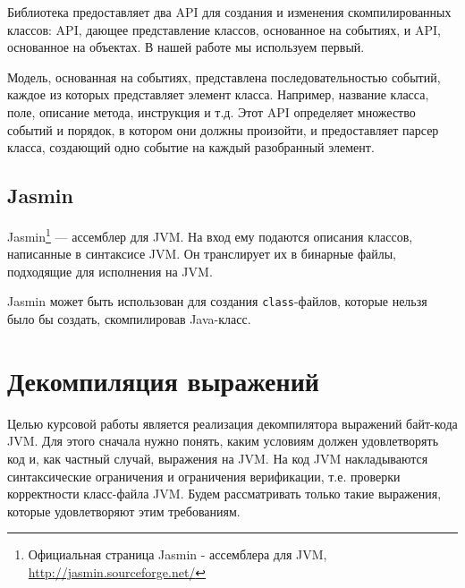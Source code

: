 \documentclass[14pt]{extarticle}
\begin{document}
Библиотека предоставляет два API для создания и изменения скомпилированных классов: API, дающее представление классов, основанное на событиях, и API, основанное на объектах. В нашей работе мы используем первый.

Модель, основанная на событиях, представлена последовательностью событий, каждое из которых представляет  элемент класса. Например, название класса, поле, описание метода, инструкция и т.д. Этот API определяет множество событий и порядок, в котором они должны произойти, и предоставляет парсер класса, создающий одно событие на каждый разобранный элемент.



\subsection{Jasmin}
Jasmin\footnote{Официальная страница Jasmin - ассемблера для JVM,
\url{http://jasmin.sourceforge.net/}} --- ассемблер для JVM. На вход ему подаются описания классов, написанные в синтаксисе JVM. Он транслирует их в бинарные файлы, подходящие для исполнения на JVM. 

Jasmin может быть использован для создания \texttt{class}-файлов, которые нельзя было бы создать, скомпилировав Java-класс.

\pagebreak
\section{Декомпиляция выражений}
Целью курсовой работы является реализация декомпилятора выражений байт-кода JVM. Для этого сначала нужно понять, каким условиям должен удовлетворять код и, как частный случай, выражения на JVM. На код JVM накладываются синтаксические ограничения и ограничения верификации, т.е. проверки корректности класс-файла JVM. Будем рассматривать только такие выражения, которые удовлетворяют этим требованиям.
\end{document}
